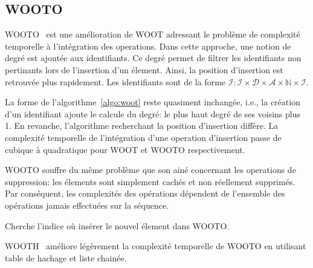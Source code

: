 
\subsection{WOOTO}

WOOTO~\cite{weiss2007wooki} est une amélioration de WOOT adressant le problème
de complexité temporelle à l'intégration des operations. Dans cette approche,
une notion de degré est ajoutée aux identifiants. Ce degré permet de filtrer
les identifiants non pertinants lors de l'insertion d'un élement. Ainsi, la
position d'insertion est retrouvée plus rapidement. Les identifiants sont de la
forme
$\mathcal{I}: \mathcal{I} \times \mathcal{D} \times \mathcal{A} \times
\mathbb{N} \times \mathcal{I}$.

La forme de l'algorithme~\ref{algo:woot} reste quasiment inchangée, i.e., la
création d'un identifiant ajoute le calcule du degré: le plus haut degré de ses
voisins plus 1. En revanche, l'algorithme recherchant la position d'insertion
diffère. La complexité temporelle de l'intégration d'une operation d'insertion
passe de cubique à quadratique pour WOOT et WOOTO respectivement.

WOOTO souffre du même problème que son ainé concernant les operations de
suppression: les élements sont simplement cachés et non réellement supprimés.
Par conséquent, les complexités des opérations dépendent de l'ensemble des 
opérations jamais effectuées sur la séquence.

\begin{algorithm}
  
  \caption{\label{algo:wootorecurs}Cherche l’indice où insérer le nouvel
    élement dans WOOTO.}
\end{algorithm}

WOOTH~\cite{ahmed2011evaluating} améliore légèrement la complexité temporelle
de WOOTO en utilisant table de hachage et liste chainée.


